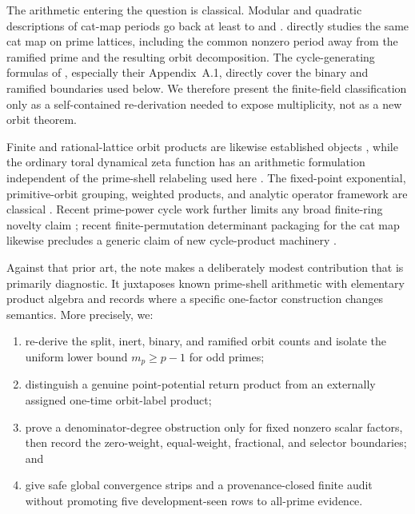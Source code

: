 \documentclass[11pt]{article}
\theoremstyle{definition}
\theoremstyle{remark}
\begin{document}
The arithmetic entering the question is classical.  Modular and quadratic
descriptions of cat-map periods go back at least to
\citet{PercivalVivaldi1987} and \citet{DysonFalk1992}.
\citet{Gaspari1994} directly studies the same cat map on prime lattices,
including the common nonzero period away from the ramified prime and the
resulting orbit decomposition.  The cycle-generating formulas of
\citet{BaakeNeumaerkerRoberts2013}, especially their Appendix~A.1, directly
cover the binary and ramified boundaries used below.  We therefore present
the finite-field classification only as a self-contained re-derivation
needed to expose multiplicity, not as a new orbit theorem.

Finite and rational-lattice orbit products are likewise established
objects \citep{BaakeRobertsWeiss2008}, while the ordinary toral dynamical
zeta function has an arithmetic formulation independent of the prime-shell
relabeling used here \citep{BaakeLauPaskunas2010}.  The fixed-point
exponential, primitive-orbit grouping, weighted products, and analytic
operator framework are classical \citep{ArtinMazur1965,Ruelle1976,
ParryPollicott1990}.  Recent prime-power cycle work further limits any broad
finite-ring novelty claim \citep{TanLi2025}; recent finite-permutation
determinant packaging for the cat map likewise precludes a generic claim of
new cycle-product machinery \citep{Chandra2026}.

Against that prior art, the note makes a deliberately modest contribution
that is primarily diagnostic.  It juxtaposes known prime-shell arithmetic
with elementary product algebra and records where a specific one-factor
construction changes semantics.  More precisely, we:
\begin{enumerate}
  \item re-derive the split, inert, binary, and ramified orbit counts and
        isolate the uniform lower bound \(m_p\ge p-1\) for odd primes;
  \item distinguish a genuine point-potential return product from an
        externally assigned one-time orbit-label product;
  \item prove a denominator-degree obstruction only for fixed nonzero scalar
        factors, then record the zero-weight, equal-weight, fractional, and
        selector boundaries; and
  \item give safe global convergence strips and a provenance-closed finite
        audit without promoting five development-seen rows to all-prime
        evidence.
\end{enumerate}
\end{document}
